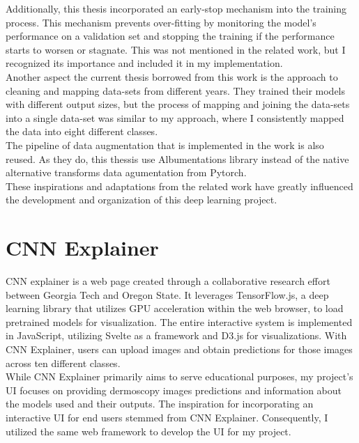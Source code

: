 Additionally, this thesis incorporated an early-stop mechanism into the training process. This mechanism prevents over-fitting by monitoring the model's performance on a validation set and stopping the training if the performance starts to worsen or stagnate. This was not mentioned in the related work, but I recognized its importance and included it in my implementation. \\

Another aspect the current thesis borrowed from this work is the approach to cleaning and mapping data-sets from different years. They trained their models with different output sizes, but the process of mapping and joining the data-sets into a single data-set was similar to my approach, where I consistently mapped the data into eight different classes. \\

The pipeline of data augmentation that is implemented in the work is also reused. As they do, this thessis use Albumentations\cite{Albumentations} library instead of the native alternative transforms data agumentation from Pytorch. \\

These inspirations and adaptations from the related work have greatly influenced the development and organization of this deep learning project.

\section{CNN Explainer}

CNN explainer is a web page created through a collaborative research effort between Georgia Tech and Oregon State\cite{CNNExplainer}. It leverages TensorFlow.js, a deep learning library that utilizes GPU acceleration within the web browser, to load pretrained models for visualization. The entire interactive system is implemented in JavaScript, utilizing Svelte as a framework and D3.js for visualizations. With CNN Explainer, users can upload images and obtain predictions for those images across ten different classes. \\

While CNN Explainer primarily aims to serve educational purposes, my project's UI focuses on providing dermoscopy images predictions and information about the models used and their outputs. The inspiration for incorporating an interactive UI for end users stemmed from CNN Explainer. Consequently, I utilized the same web framework to develop the UI for my project.
